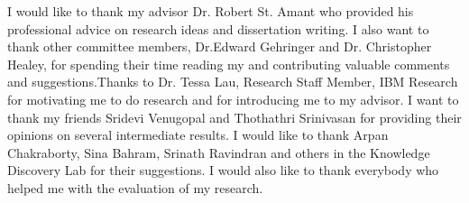 \begin{acknowledgements}

I would like to thank my advisor Dr. Robert St. Amant who provided his professional advice on research ideas and dissertation writing. I also want to thank other committee members, Dr.Edward Gehringer and Dr. Christopher Healey,  for spending their time reading my  and contributing valuable comments and suggestions.Thanks to Dr. Tessa Lau, Research Staff Member, IBM Research for motivating me to do research and for introducing me to my advisor. I want to thank my friends Sridevi Venugopal and Thothathri Srinivasan for providing their opinions on several intermediate results. I would like to thank Arpan Chakraborty, Sina Bahram, Srinath Ravindran and others in the Knowledge Discovery Lab for their suggestions. I would also like to thank everybody who helped me with the evaluation of my research.

\end{acknowledgements}


\thesistableofcontents

\thesislistoftables

\thesislistoffigures
